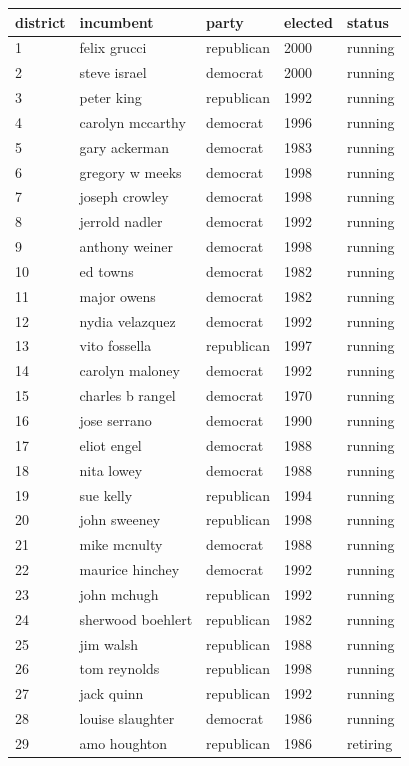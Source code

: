 \documentclass{article}
\begin{document}
\begin{tabular}{lllll}
\toprule
district & incumbent & party & elected & status \\
\midrule
1 & felix grucci & republican & 2000 & running \\
2 & steve israel & democrat & 2000 & running \\
3 & peter king & republican & 1992 & running \\
4 & carolyn mccarthy & democrat & 1996 & running \\
5 & gary ackerman & democrat & 1983 & running \\
6 & gregory w meeks & democrat & 1998 & running \\
7 & joseph crowley & democrat & 1998 & running \\
8 & jerrold nadler & democrat & 1992 & running \\
9 & anthony weiner & democrat & 1998 & running \\
10 & ed towns & democrat & 1982 & running \\
11 & major owens & democrat & 1982 & running \\
12 & nydia velazquez & democrat & 1992 & running \\
13 & vito fossella & republican & 1997 & running \\
14 & carolyn maloney & democrat & 1992 & running \\
15 & charles b rangel & democrat & 1970 & running \\
16 & jose serrano & democrat & 1990 & running \\
17 & eliot engel & democrat & 1988 & running \\
18 & nita lowey & democrat & 1988 & running \\
19 & sue kelly & republican & 1994 & running \\
20 & john sweeney & republican & 1998 & running \\
21 & mike mcnulty & democrat & 1988 & running \\
22 & maurice hinchey & democrat & 1992 & running \\
23 & john mchugh & republican & 1992 & running \\
24 & sherwood boehlert & republican & 1982 & running \\
25 & jim walsh & republican & 1988 & running \\
26 & tom reynolds & republican & 1998 & running \\
27 & jack quinn & republican & 1992 & running \\
28 & louise slaughter & democrat & 1986 & running \\
29 & amo houghton & republican & 1986 & retiring \\
\bottomrule
\end{tabular}
\end{document}
